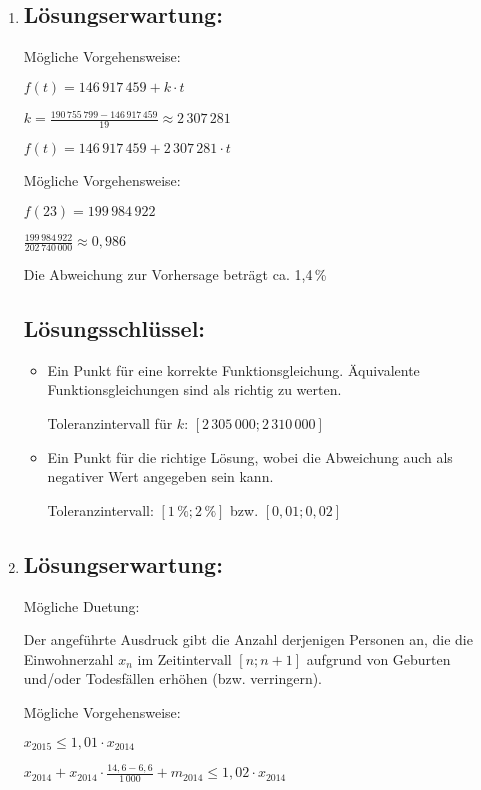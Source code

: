 \begin{langesbeispiel}
{\begin{enumerate}
	\item \subsection{Lösungserwartung:}

Mögliche Vorgehensweise:

$f(t)=146\,917\,459+k\cdot t$

$k=\frac{190\,755\,799-146\,917\,459}{19}\approx 2\,307\,281$

$f(t)=146\,917\,459+2\,307\,281\cdot t$\leer

Mögliche Vorgehensweise:

$f(23)=199\,984\,922$

$\frac{199\,984\,922}{202\,740\,000}\approx 0,986$

Die Abweichung zur Vorhersage beträgt ca. 1,4\,\%

\subsection{Lösungsschlüssel:}
\begin{itemize}
	\item Ein Punkt für eine korrekte Funktionsgleichung. Äquivalente Funktionsgleichungen sind als richtig zu werten.
	
	Toleranzintervall für $k:\,[2\,305\,000;2\,310\,000]$
	
	\item Ein Punkt für die richtige Lösung, wobei die Abweichung auch als negativer Wert angegeben sein kann.
	
	Toleranzintervall: $[1\,\%;2\,\%]$ bzw. $[0,01;0,02]$
\end{itemize}

\item \subsection{Lösungserwartung:}

Mögliche Duetung:

Der angeführte Ausdruck gibt die Anzahl derjenigen Personen an, die die Einwohnerzahl $x_n$ im Zeitintervall $[n;n+1]$ aufgrund von Geburten und/oder Todesfällen erhöhen (bzw. verringern).\leer

Mögliche Vorgehensweise:

$x_{2015}\leq 1,01\cdot x_{2014}$

$x_{2014}+x_{2014}\cdot\frac{14,6-6,6}{1\,000}+m_{2014}\leq 1,02\cdot x_{2014}$


\end{enumerate}}
\end{langesbeispiel}
